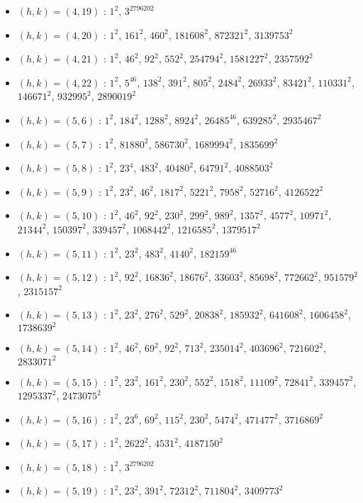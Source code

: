 \begin{itemize}
\item $(h,k)=(4,19)$ : $1^{2}$, $3^{2796202}$
\item $(h,k)=(4,20)$ : $1^{2}$, $161^{2}$, $460^{2}$, $181608^{2}$, $872321^{2}$, $3139753^{2}$
\item $(h,k)=(4,21)$ : $1^{2}$, $46^{2}$, $92^{2}$, $552^{2}$, $254794^{2}$, $1581227^{2}$, $2357592^{2}$
\item $(h,k)=(4,22)$ : $1^{2}$, $5^{46}$, $138^{2}$, $391^{2}$, $805^{2}$, $2484^{2}$, $26933^{2}$, $83421^{2}$, $110331^{2}$, $146671^{2}$, $932995^{2}$, $2890019^{2}$
\item $(h,k)=(5,6)$ : $1^{2}$, $184^{2}$, $1288^{2}$, $8924^{2}$, $26485^{46}$, $639285^{2}$, $2935467^{2}$
\item $(h,k)=(5,7)$ : $1^{2}$, $81880^{2}$, $586730^{2}$, $1689994^{2}$, $1835699^{2}$
\item $(h,k)=(5,8)$ : $1^{2}$, $23^{4}$, $483^{2}$, $40480^{2}$, $64791^{2}$, $4088503^{2}$
\item $(h,k)=(5,9)$ : $1^{2}$, $23^{2}$, $46^{2}$, $1817^{2}$, $5221^{2}$, $7958^{2}$, $52716^{2}$, $4126522^{2}$
\item $(h,k)=(5,10)$ : $1^{2}$, $46^{2}$, $92^{2}$, $230^{2}$, $299^{2}$, $989^{2}$, $1357^{2}$, $4577^{2}$, $10971^{2}$, $21344^{2}$, $150397^{2}$, $339457^{2}$, $1068442^{2}$, $1216585^{2}$, $1379517^{2}$
\item $(h,k)=(5,11)$ : $1^{2}$, $23^{2}$, $483^{2}$, $4140^{2}$, $182159^{46}$
\item $(h,k)=(5,12)$ : $1^{2}$, $92^{2}$, $16836^{2}$, $18676^{2}$, $33603^{2}$, $85698^{2}$, $772662^{2}$, $951579^{2}$, $2315157^{2}$
\item $(h,k)=(5,13)$ : $1^{2}$, $23^{2}$, $276^{2}$, $529^{2}$, $20838^{2}$, $185932^{2}$, $641608^{2}$, $1606458^{2}$, $1738639^{2}$
\item $(h,k)=(5,14)$ : $1^{2}$, $46^{2}$, $69^{2}$, $92^{2}$, $713^{2}$, $235014^{2}$, $403696^{2}$, $721602^{2}$, $2833071^{2}$
\item $(h,k)=(5,15)$ : $1^{2}$, $23^{2}$, $161^{2}$, $230^{2}$, $552^{2}$, $1518^{2}$, $11109^{2}$, $72841^{2}$, $339457^{2}$, $1295337^{2}$, $2473075^{2}$
\item $(h,k)=(5,16)$ : $1^{2}$, $23^{6}$, $69^{2}$, $115^{2}$, $230^{2}$, $5474^{2}$, $471477^{2}$, $3716869^{2}$
\item $(h,k)=(5,17)$ : $1^{2}$, $2622^{2}$, $4531^{2}$, $4187150^{2}$
\item $(h,k)=(5,18)$ : $1^{2}$, $3^{2796202}$
\item $(h,k)=(5,19)$ : $1^{2}$, $23^{2}$, $391^{2}$, $72312^{2}$, $711804^{2}$, $3409773^{2}$

\end{itemize}
